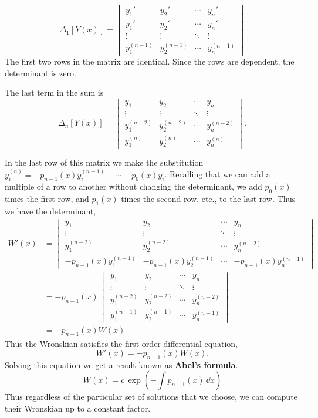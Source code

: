 \[ \Delta_1[Y(x)] = 
\begin{vmatrix}
  y_1' &          y_2' &          \cdots &        y_n' \\
  y_1' &          y_2' &          \cdots &        y_n' \\
  \vdots &        \vdots &        \ddots &        \vdots \\
  y_1^{(n-1)} &   y_2^{(n-1)} &   \cdots &        y_n^{(n-1)}
\end{vmatrix}
\]
The first two rows in the matrix are identical.  Since the rows are  
dependent, the determinant is zero.  

The last term in the sum is
\[ \Delta_n[Y(x)] = 
\begin{vmatrix}
  y_1 &           y_2 &           \cdots &        y_n \\
  \vdots &        \vdots &        \ddots &        \vdots \\
  y_1^{(n-2)} &   y_2^{(n-2)} &   \cdots &        y_n^{(n-2)} \\
  y_1^{(n)} &     y_2^{(n)} &     \cdots &        y_n^{(n)}
\end{vmatrix} .
\]

In the last row of this matrix we make the substitution $y_i^{(n)} = 
-p_{n-1}(x) y_i^{(n-1)} - \cdots - p_0(x) y_i$.  Recalling that we can 
add a multiple of a row to another without changing the determinant, we add
$p_0(x)$ times the first row, and $p_1(x)$ times the second row, etc., to 
the last row.  Thus we have the determinant,
\begin{align*} 
  W'(x)   &= 
  \begin{vmatrix}
    y_1 &           y_2 &           \cdots &        y_n \\
    \vdots &        \vdots &        \ddots &        \vdots \\
    y_1^{(n-2)} &   y_2^{(n-2)} &   \cdots &        y_n^{(n-2)} \\
    -p_{n-1}(x)y_1^{(n-1)} & -p_{n-1}(x)y_2^{(n-1)} & \cdots & 
    -p_{n-1}(x)y_n^{(n-1)}
  \end{vmatrix} 
  \\
  &= -p_{n-1}(x)\  
  \begin{vmatrix}
    y_1 &           y_2 &           \cdots &        y_n \\
    \vdots &        \vdots &        \ddots &        \vdots \\
    y_1^{(n-2)} &   y_2^{(n-2)} &   \cdots &        y_n^{(n-2)} \\
    y_1^{(n-1)} &   y_2^{(n-1)} &   \cdots &        y_n^{(n-1)}
  \end{vmatrix}
  \\
  &= -p_{n-1}(x)W(x)
\end{align*}
Thus the Wronskian satisfies the first order differential equation,
\[ 
W'(x) = -p_{n-1}(x) W(x). 
\]
Solving this equation we get a result known as \textbf{Abel's formula}.
\index{Abel's formula}
\[
W(x) = c\,\exp \left( -\int p_{n-1}(x)\,\dd x \right) 
\]
Thus regardless of the particular set of solutions that we choose, we can
compute their Wronskian up to a constant factor.


